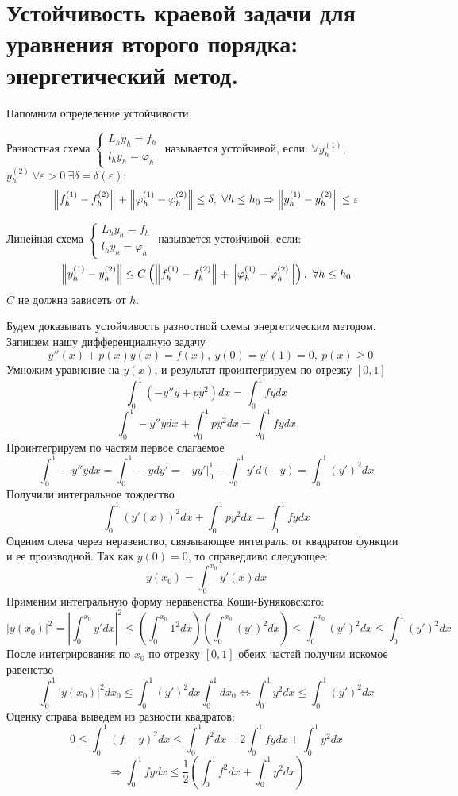\section{Устойчивость краевой задачи для уравнения второго порядка: энергетический метод.}

Напомним определение устойчивости
\begin{definition}
  Разностная схема $\begin{cases}
      L_hy_h = f_h \\
      l_hy_h = \varphi_h
    \end{cases}$
  называется устойчивой, если:
  $\forall y_h^{(1)}$, $y_h^{(2)}\ \forall \varepsilon > 0\ \exists\delta=\delta(\varepsilon):$
  \[\norm{f^{(1)}_h-f^{(2)}_h}+\norm{\varphi^{(1)}_h-\varphi^{(2)}_h}\leq\delta,\ \forall h\leq h_0\Rightarrow\norm{y^{(1)}_h-y^{(2)}_h}\leq\varepsilon\]
\end{definition}
\begin{definition}
  Линейная схема $\begin{cases}
      L_hy_h = f_h \\
      l_hy_h = \varphi_h
    \end{cases}$
  называется устойчивой, если:
  \[\norm{y^{(1)}_h-y^{(2)}_h}\leq C\left(\norm{f^{(1)}_h-f^{(2)}_h}+\norm{\varphi^{(1)}_h-\varphi^{(2)}_h}\right),\ \forall h\leq h_0\]
  $C$ не должна зависеть от $h$.
\end{definition}

Будем доказывать устойчивость разностной схемы энергетическим методом.
Запишем нашу дифференциалную задачу
\[-y''(x)+p(x)y(x)=f(x),\ y(0) = y'(1) = 0,\ p(x)\geq 0\]
Умножим уравнение на $y(x)$, и результат проинтегрируем по отрезку $[0, 1]$
\[\int_0^1 (-y''y+py^2)dx = \int_0^1fydx \]
\[\int_0^1 -y''ydx+ \int_0^1py^2 dx = \int_0^1fydx \]
Проинтегрируем по частям первое слагаемое
\[\int_0^1 -y''ydx = \int_0^1-ydy' = -yy'\vert^1_0 - \int_0^1y'd(-y) = \int_0^1(y')^2dx\]
Получили интегральное тождество
\[\int_0^1 (y'(x))^2dx+ \int_0^1py^2 dx = \int_0^1fydx \]
Оценим слева через неравенство, связывающее интегралы от квадратов
функции и ее производной. Так как $y(0) = 0$, то справедливо следующее:
\[y(x_0) = \int_0^{x_0}y'(x)dx\]
Применим интегральную форму неравенства Коши-Буняковского:
\[|y(x_0)|^2 = \left|\int_0^{x_0}y'dx\right|^2\leq\left(\int_0^{x_0}1^2dx\right)\left(\int_0^{x_0}(y')^2dx\right)\leq\int_0^{x_0}(y')^2dx\leq\int_0^{1}(y')^2dx\]
После интегрирования по $x_0$ по отрезку $[0,1]$ обеих частей получим искомое равенство
\[\int_0^1|y(x_0)|^2dx_0 \leq \int_0^{1}(y')^2dx\int_0^1dx_0 \Leftrightarrow \int_0^1y^2dx\leq\int_0^1(y')^2dx\]
Оценку справа выведем из разности квадратов:
\[0\leq\int_0^1(f - y)^2dx\leq\int_0^1f^2dx-2\int_0^1fydx+\int_0^1y^2dx\]
\[\Rightarrow\int_0^1fydx\leq\frac{1}{2}\left(\int_0^1f^2dx + \int_0^1y^2dx\right)\]

